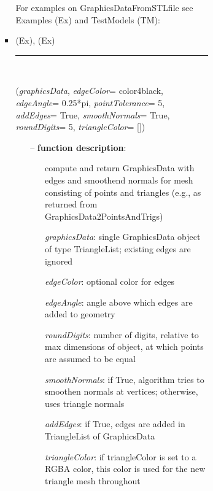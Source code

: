 \begin{itemize}[leftmargin=1.4cm]
\begin{itemize}[leftmargin=1.4cm]
\begin{itemize}[leftmargin=0.5cm]
\begin{itemize}[leftmargin=1.4cm]
\begin{itemize}[leftmargin=1.4cm]
\begin{itemize}[leftmargin=0.5cm]
\begin{itemize}[leftmargin=1.4cm]
\begin{itemize}[leftmargin=0.5cm]
%
%
\noindent For examples on GraphicsDataFromSTLfile see Examples (Ex) and TestModels (TM):
\bi
 \item \footnotesize {} (Ex), 
 (Ex)\ei

%
\noindent\rule{8cm}{0.75pt}\vspace{1pt} \\ 
\begin{flushleft}
\label{sec:graphicsDataUtilities:AddEdgesAndSmoothenNormals}
({\it graphicsData}, {\it edgeColor}= color4black, {\it edgeAngle}= 0.25*pi, {\it pointTolerance}= 5, {\it addEdges}= True, {\it smoothNormals}= True, {\it roundDigits}= 5, {\it triangleColor}= [])
\end{flushleft}
\setlength{\itemindent}{0.7cm}
\begin{itemize}[leftmargin=0.7cm]
  \item[--]  {\bf function description}: \vspace{-6pt}
  \begin{itemize}[leftmargin=1.2cm]
\setlength{\itemindent}{-0.7cm}
    \item[] compute and return GraphicsData with edges and smoothend normals for mesh consisting of points and triangles (e.g., as returned from GraphicsData2PointsAndTrigs)
    \item[] {\it   graphicsData}: single GraphicsData object of type TriangleList; existing edges are ignored
    \item[] {\it   edgeColor}: optional color for edges
    \item[] {\it   edgeAngle}: angle above which edges are added to geometry
    \item[] {\it   roundDigits}: number of digits, relative to max dimensions of object, at which points are assumed to be equal
    \item[] {\it   smoothNormals}: if True, algorithm tries to smoothen normals at vertices; otherwise, uses triangle normals
    \item[] {\it   addEdges}: if True, edges are added in TriangleList of GraphicsData
    \item[] {\it   triangleColor}: if triangleColor is set to a RGBA color, this color is used for the new triangle mesh throughout

\end{itemize}
\end{itemize}
\end{itemize}
\end{itemize}
\end{itemize}
\end{itemize}
\end{itemize}
\end{itemize}
\end{itemize}
\end{itemize}
